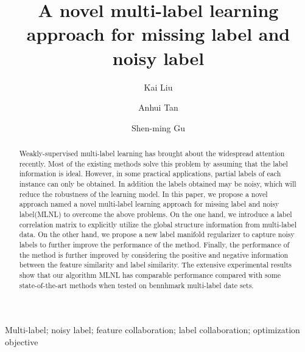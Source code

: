 \documentclass[final,3p,times]{elsarticle}
\begin{document}
\begin{frontmatter}



\title{A novel multi-label learning approach for missing label and noisy label}


\author[a]{Kai Liu}\vskip 2mm
\author[a,b]{Anhui Tan}\vskip 2mm
\author[b]{Shen-ming Gu}\vskip 2mm

\address[a]{School of Information Engineering, Zhejiang Ocean University, Zhoushan, Zhejiang 316022, PR China}
\address[b]{School of Computer and Information Technology, Shanxi University, Taiyuan, 030006, Shanxi, PR China}


\begin{abstract}
	
Weakly-supervised multi-label learning has brought about the widespread attention recently. Most of the existing methods solve this problem by assuming that the label information is ideal. However, in some practical applications, partial labels of each instance can only be obtained. In addition the labels obtained may be noisy, which will reduce the robustness of the learning model. In this paper, we propose a novel approach named a novel multi-label learning approach for missing label and noisy label(MLNL) to overcome the above problems. On the one hand, we introduce a label correlation matrix to explicitly utilize the global structure information from multi-label data. On the other hand, we propose a new label manifold regularizer to capture noisy labels to further improve the performance of the method. Finally, the performance of the method is further improved by considering the positive and negative information between the feature similarity and label similarity. The extensive experimental results show that our algorithm MLNL has  comparable performance compared with some state-of-the-art methods when tested on bennhmark multi-label date sets.

	



\end{abstract}

\begin{keyword}
Multi-label; noisy label; feature collaboration; label collaboration; optimization objective
\end{keyword}


\end{frontmatter}
\end{document}
